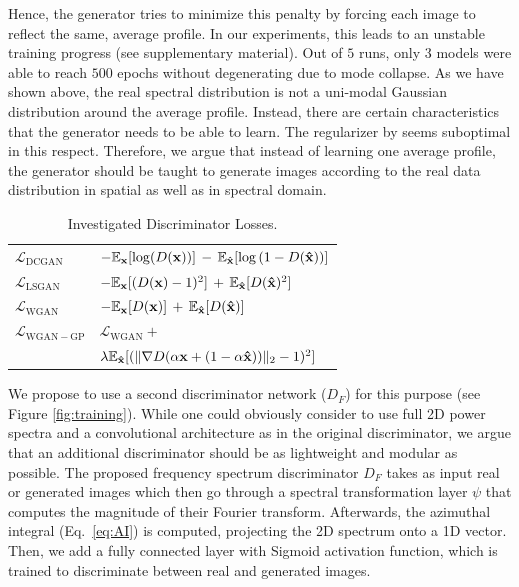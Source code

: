\documentclass[letterpaper]{article} %
\begin{document}
Hence, the generator tries to minimize this penalty by forcing each image to reflect the same, average profile.
In our experiments, this leads to an unstable training progress (see supplementary material). Out of $5$ runs, only $3$ models were able to reach $500$ epochs without degenerating due to mode collapse.
As we have shown above, the real spectral distribution is not a uni-modal Gaussian distribution around the average profile.
Instead, there are certain characteristics that the generator needs to be able to learn. The regularizer by \cite{margret2020upconvolution} seems suboptimal in this respect. Therefore, we argue that instead of learning one average profile, the generator should be taught to generate images according to the real data distribution in spatial as well as in spectral domain.

\begin{table}
    \caption{Investigated Discriminator Losses.}
    \label{tab0}
    \centering
    \begin{tabular}{ll}
    \toprule
    $\mathcal{L}_{\mathrm{DCGAN}}$& $- \mathbb{E}_{{\bf x}%
    }
    [\mathrm{log}(D({\bf x}))]\,-\,
\mathbb{E}_{{\bf \hat{x}}%
}
[\mathrm{log}\left(1-D({\bf \hat{x}})\right)]$\\
$\mathcal{L}_{\mathrm{LSGAN}}$& $- \mathbb{E}_{{\bf x}%
}[(D({\bf x})-1)^2]\,+\,
\mathbb{E}_{{\bf \hat{x}}%
}
[D({\bf \hat{x}})^2]$\\
$\mathcal{L}_{\mathrm{WGAN}}$& $- \mathbb{E}_{{\bf x}%
}[D({\bf x})]\,+\,
\mathbb{E}_{{\bf \hat{x}}
}
[D({\bf \hat{x}})]$\\
$\mathcal{L}_{\mathrm{WGAN-GP}}$& $\mathcal{L}_{\mathrm{WGAN}}+$\\
&$\lambda \mathbb{E}_{{\bf \hat{x}} %
}[(\|\nabla D(\alpha {\bf x}+(1-\alpha {\bf \hat{x}}))\|_2-1)^2] $\\

    \bottomrule
    
    \end{tabular}
    \end{table}

We propose to use a second discriminator network ($D_F$) for this purpose (see Figure \ref{fig:training}).
While one could obviously consider to use full 2D power spectra and a convolutional architecture as in the original discriminator, we argue that an additional discriminator should be as lightweight and modular as possible.
The proposed frequency spectrum discriminator $D_F$ takes as input real or generated images which then go through a spectral transformation layer $\psi$ that computes the magnitude of their Fourier transform.
Afterwards, the azimuthal integral (Eq.~\eqref{eq:AI}) is computed, projecting the 2D spectrum onto a 1D vector. Then, we add a fully connected layer with Sigmoid activation function, which is trained to discriminate between real and generated images. 
\end{document}
